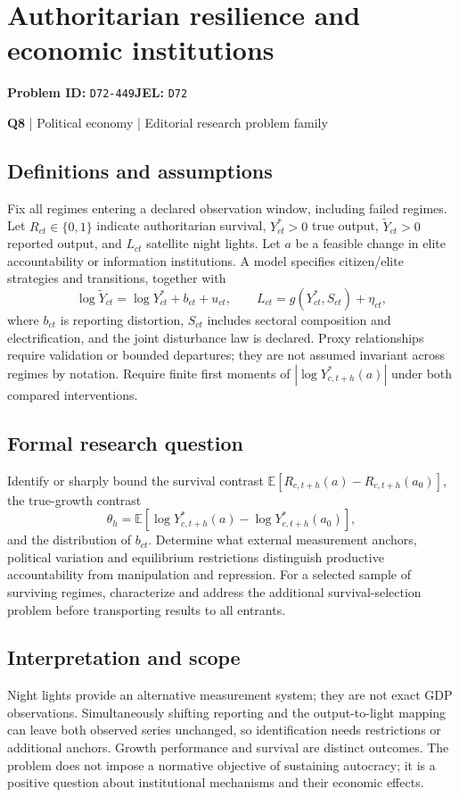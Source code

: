 \documentclass[11pt,a4paper]{article}
\begin{document}
\section*{Authoritarian resilience and economic institutions}
\textbf{Problem ID:} \texttt{D72-449}\quad \textbf{JEL:} \texttt{D72}\par
\label{problem:OP-0128}
\label{atlas:prob:Q8}
{\sffamily\small\color{muted}\textbf{Q8} | Political economy | Editorial research problem family\par}
\subsection*{Definitions and assumptions}
Fix all regimes entering a declared observation window, including failed regimes. Let $R_{ct}\in\{0,1\}$ indicate authoritarian survival, $Y^*_{ct}>0$ true output, $\widetilde Y_{ct}>0$ reported output, and $L_{ct}$ satellite night lights. Let $a$ be a feasible change in elite accountability or information institutions. A model specifies citizen/elite strategies and transitions, together with
\[
\log\widetilde Y_{ct}=\log Y^*_{ct}+b_{ct}+u_{ct},\qquad
L_{ct}=g(Y^*_{ct},S_{ct})+\eta_{ct},
\]
where $b_{ct}$ is reporting distortion, $S_{ct}$ includes sectoral composition and electrification, and the joint disturbance law is declared. Proxy relationships require validation or bounded departures; they are not assumed invariant across regimes by notation. Require finite first moments of $|\log Y^*_{c,t+h}(a)|$ under both compared interventions.
\subsection*{Formal research question}
Identify or sharply bound the survival contrast $\mathbb E[R_{c,t+h}(a)-R_{c,t+h}(a_0)]$, the true-growth contrast
\[
\theta_h=\mathbb E[\log Y^*_{c,t+h}(a)-\log Y^*_{c,t+h}(a_0)],
\]
and the distribution of $b_{ct}$. Determine what external measurement anchors, political variation and equilibrium restrictions distinguish productive accountability from manipulation and repression. For a selected sample of surviving regimes, characterize and address the additional survival-selection problem before transporting results to all entrants.
\subsection*{Interpretation and scope}
Night lights provide an alternative measurement system; they are not exact GDP observations. Simultaneously shifting reporting and the output-to-light mapping can leave both observed series unchanged, so identification needs restrictions or additional anchors. Growth performance and survival are distinct outcomes. The problem does not impose a normative objective of sustaining autocracy; it is a positive question about institutional mechanisms and their economic effects.
\end{document}
